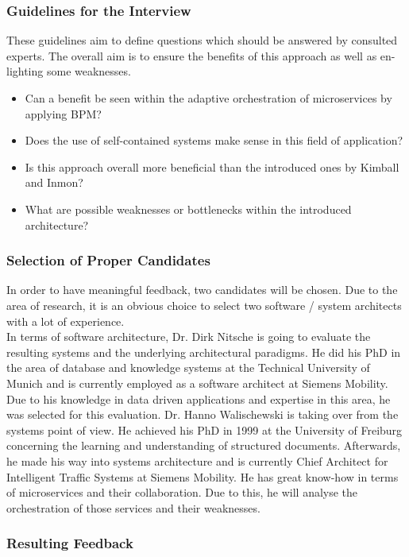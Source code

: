 \subsubsection{Guidelines for the Interview}
These guidelines aim to define questions which should be answered by consulted experts. The overall aim is to ensure the benefits of this approach as well as en-lighting some weaknesses. 
\begin{itemize}
    \item Can a benefit be seen within the adaptive orchestration of microservices by applying BPM?
    \item Does the use of self-contained systems make sense in this field of application?
    \item Is this approach overall more beneficial than the introduced ones by Kimball and Inmon?
    \item What are possible weaknesses or bottlenecks within the introduced architecture?
\end{itemize}

\subsubsection{Selection of Proper Candidates}
In order to have meaningful feedback, two candidates will be chosen. Due to the area of research, it is an obvious choice to select two software / system architects with a lot of experience.\newline
\\
In terms of software architecture, Dr. Dirk Nitsche is going to evaluate the resulting systems and the underlying architectural paradigms. He did his PhD in the area of database and knowledge systems at the Technical University of Munich and is currently employed as a software architect at Siemens Mobility. Due to his knowledge in data driven applications and expertise in this area, he was selected for this evaluation.\newline
Dr. Hanno Walischewski is taking over from the systems point of view. He achieved his PhD in 1999 at the University of Freiburg concerning the learning and understanding of structured documents. Afterwards, he made his way into systems architecture and is currently Chief Architect for Intelligent Traffic Systems at Siemens Mobility. He has great know-how in terms of microservices and their collaboration. Due to this, he will analyse the orchestration of those services and their weaknesses.  

\subsubsection{Resulting Feedback}
\cite{dirk}
\cite{hanno}